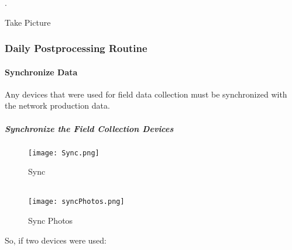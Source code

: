  .

 \vspace{.5in}

\vspace{1.5in} 
 
 \vspace{2in}

 
 \vspace{.25in}
 

\vspace{.25in}


\vspace{.2in}

\noindent Take Picture

\vspace{.25in}


\vspace{.25in}




 \clearpage

%
%
 \subsubsection{Daily Postprocessing Routine}
 \paragraph{Synchronize Data}

 Any devices that were used for field data collection must be synchronized with the network production data.

 \vspace{.5in}

 \subparagraph{Synchronize the Field Collection Devices}

 \begin{wrapfigure}{r}{0.5\textwidth}
 \centering
     \texttt{[image: Sync.png]}
 \caption{Sync}
 \vspace{.05in}

 \HRule \\[.4cm] %
 \vspace{.05in}
     \texttt{[image: syncPhotos.png]}
 \caption{Sync Photos}

 \end{wrapfigure}
 So, if two devices were used:

